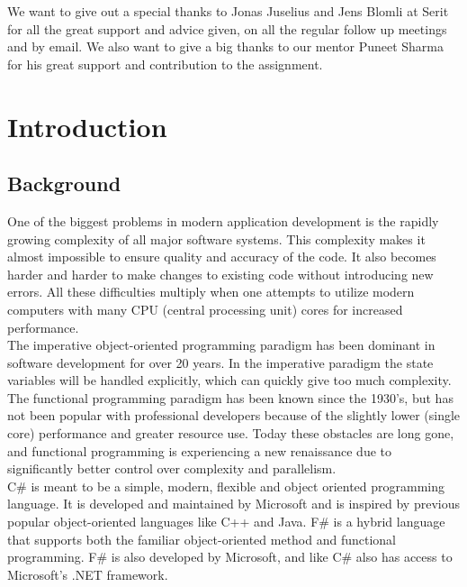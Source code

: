 \documentclass[12pt, a4paper]{article}
\begin{document}
We want to give out a special thanks to Jonas Juselius and Jens Blomli at Serit for all the great support and advice given, on all the regular follow up meetings and by email. We also want to give a big thanks to our mentor Puneet Sharma for his great support and contribution to the assignment.\\

\newpage
\tableofcontents

\newpage
\section{Introduction}
\subsection{Background}
One of the biggest problems in modern application development is the rapidly growing complexity of all major software systems. This complexity makes it almost impossible to ensure quality and accuracy of the code. It also becomes harder and harder to make changes to existing code without introducing new errors. All these difficulties multiply when one attempts to utilize modern computers with many CPU (central processing unit) cores for increased performance.\\

The imperative object-oriented programming paradigm has been dominant in software development for over 20 years. In the imperative paradigm the state variables will be handled explicitly, which can quickly give too much complexity. The functional programming paradigm has been known since the 1930’s, but has not been popular with professional developers because of the slightly lower (single core) performance and greater resource use. Today these obstacles are long gone, and functional programming is experiencing a new renaissance due to significantly better control over complexity and parallelism.\\

C\# is meant to be a simple, modern, flexible and object oriented programming language. It is developed and maintained by Microsoft and is inspired by previous popular object-oriented languages like C++ and Java. F\# is a hybrid language that supports both the familiar object-oriented method and functional programming. F\# is also developed by Microsoft, and like C\# also has access to Microsoft’s .NET framework. 
\end{document}

